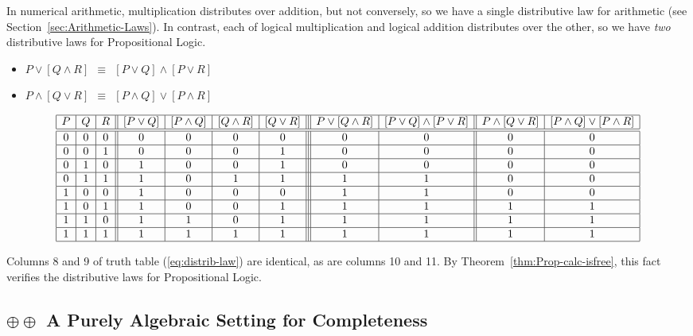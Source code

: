 \noindent
In numerical arithmetic, multiplication distributes over addition, but not conversely, so we have a single distributive law for arithmetic (see Section~\ref{sec:Arithmetic-Laws}).  In contrast, each of logical multiplication and logical addition distributes over the other, so we have {\em two} distributive laws for Propositional Logic.
\begin{itemize}
\item
$ P \vee [ Q \wedge R] \ \ \equiv \ \ [P \vee Q] \wedge [P \vee R]$
\medskip\item
$P \wedge [ Q \vee R] \ \ \equiv \ \ [P \wedge Q] \vee [P \wedge R]$
\end{itemize}
{\small
\begin{equation}
\label{eq:distrib-law}
\begin{array}{|c|c|c||c|c|c|c|||c|c||c|c|}
\hline
P & Q & R
  & [P \vee Q]
  & [P \wedge Q]
  & [Q \wedge R] 
  & [Q \vee R] 
  & P \vee [ Q \wedge R]
  & [P \vee Q] \wedge [P \vee R]
  & P \wedge [ Q \vee R]
  & [P \wedge Q] \vee [P \wedge R] \\
\hline
\hline
0 & 0 & 0
  & 0
  & 0
  & 0
  & 0
  & 0
  & 0
  & 0
  & 0 \\ 
\hline
0 & 0 & 1
  & 0
  & 0
  & 0
  & 1
  & 0
  & 0
  & 0 
  & 0 \\
\hline
0 & 1 & 0
  & 1
  & 0
  & 0
  & 1
  & 0
  & 0
  & 0
  & 0 \\
\hline
0 & 1 & 1
  & 1
  & 0
  & 1
  & 1
  & 1
  & 1
  & 0
  & 0 \\
\hline
1 & 0 & 0
  & 1
  & 0
  & 0
  & 0
  & 1
  & 1
  & 0
  & 0 \\
\hline
1 & 0 & 1
  & 1
  & 0
  & 0
  & 1
  & 1
  & 1
  & 1
  & 1 \\
\hline
1 & 1 & 0
  & 1
  & 1
  & 0
  & 1
  & 1
  & 1
  & 1
  & 1 \\
\hline
1 & 1 & 1
  & 1
  & 1
  & 1
  & 1
  & 1
  & 1
  & 1
  & 1 \\
\hline
\end{array}
\end{equation}
}

Columns 8 and 9 of truth table (\ref{eq:distrib-law}) are identical, as are columns 10 and 11.  By Theorem~\ref{thm:Prop-calc-isfree}, this fact verifies the distributive laws for Propositional Logic.


\subsection{$\oplus \oplus$ A Purely Algebraic Setting for Completeness}

